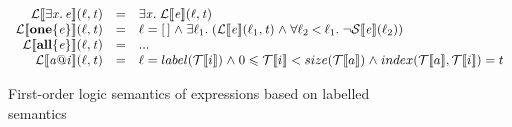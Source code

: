 \documentclass[acmsmall,review,dvipsnames]{acmart}
\newcommand{\Varid}[1]{\mathit{#1}}
\renewcommand{\leq}{\leqslant}
\newcommand{\semfun}[1]{\mathcal{#1}}
\newcommand{\folapp}[2]{\semfun{L}\llbracket #1 \rrbracket #2}
\newcommand{\sfolapp}[2]{\semfun{S}\llbracket #1 \rrbracket #2}
\newcommand{\termapp}[2]{\semfun{T}\llbracket #1 \rrbracket #2}
\begin{document}
\begin{figure}
$$\begin{array}{rcll}
  \folapp{\ensuremath{\exists\Varid{x}.\,\Varid{e}}}(\ensuremath{\ell,\Varid{t}}) & = &
    \exists \ensuremath{\Varid{x}} . \; \folapp{\ensuremath{\Varid{e}}}(\ensuremath{\ell,\Varid{t}}) \\
  \folapp{\ensuremath{\textbf{one}\{\Varid{e}\}}}(\ensuremath{\ell,\Varid{t}}) & = & \ensuremath{\ell\mathrel{=}[\mskip1.5mu \mskip1.5mu]\mathrel{\wedge}}
  \exists \ensuremath{\ell_1} . \; (\folapp{\ensuremath{\Varid{e}}}(\ensuremath{\ell_1,\Varid{t}}) \ensuremath{\mathrel{\wedge}} \forall \ensuremath{\ell_2\mathbin{<}\ell_1} . \; \neg{}\sfolapp{\ensuremath{\Varid{e}}}(\ensuremath{\ell_2}) ) \\
  \folapp{\ensuremath{\textbf{all}\{\Varid{e}\}}}(\ensuremath{\ell,\Varid{t}}) & = & ... \\
  \folapp{\ensuremath{\Varid{a}\mathord{@}\Varid{i}}}(\ensuremath{\ell,\Varid{t}}) & = & \ensuremath{\ell\mathrel{=}} label(\termapp{i}) \ensuremath{\mathrel{\wedge}} 0 \leq \termapp{i} < size(\termapp{a}) \ensuremath{\mathrel{\wedge}} index(\termapp{a},\termapp{i}) = t\\
  \end{array}
$$
\caption{First-order logic semantics of expressions based on labelled semantics}
\end{figure}

\end{document}
